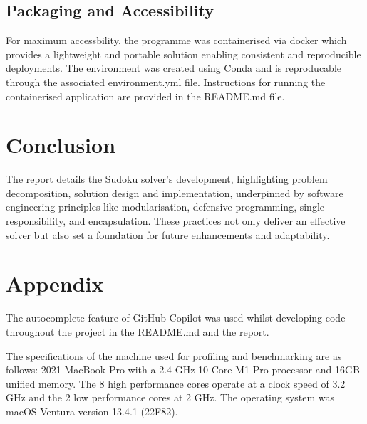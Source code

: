 \documentclass[11pt]{article}
\begin{document}
\subsection{Packaging and Accessibility}
For maximum accessbility, the programme was containerised via docker which provides a lightweight and portable solution enabling consistent and reproducible deployments. The environment was created using Conda and is reproducable through the associated environment.yml file. Instructions for running the containerised application are provided in the README.md file.

\section{Conclusion}
The report details the Sudoku solver's development, highlighting problem decomposition, solution design and implementation, underpinned by software engineering principles like modularisation, defensive programming, single responsibility, and encapsulation. These practices not only deliver an effective solver but also set a foundation for future enhancements and adaptability.

\section{Appendix}
The autocomplete feature of GitHub Copilot was used whilst developing code throughout the project
in the README.md and the report.

The specifications of the machine used for profiling and benchmarking are as follows:
2021 MacBook Pro with a 2.4 GHz 10-Core M1 Pro processor and
16GB unified memory. The 8 high performance cores operate at a clock speed of 3.2 GHz and the 2
low performance cores at 2 GHz. The operating system was macOS Ventura version 13.4.1 (22F82).



\end{document}

